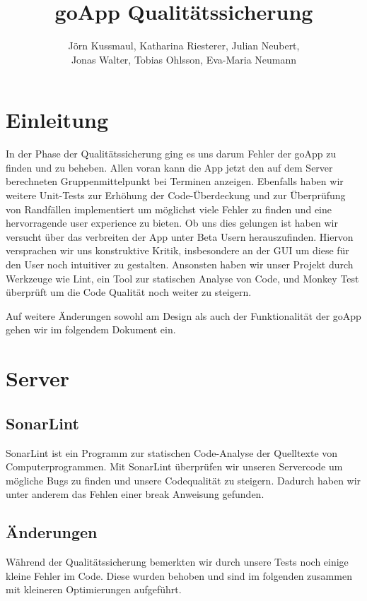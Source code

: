 \documentclass{scrartcl}
\title{goApp Qualitätssicherung}
\author{Jörn Kussmaul, Katharina Riesterer, Julian Neubert,\\ Jonas Walter, Tobias Ohlsson, Eva-Maria Neumann}
\begin{document}
	\maketitle
	\newpage
	\tableofcontents
	\newpage

\section{Einleitung}
In der Phase der Qualitätssicherung ging es uns darum Fehler der goApp zu finden und zu beheben.
Allen voran kann die App jetzt den auf dem Server berechneten Gruppenmittelpunkt bei Terminen anzeigen.
\newline
Ebenfalls haben wir weitere Unit-Tests zur Erhöhung der Code-Überdeckung und zur Überprüfung von Randfällen implementiert um möglichst viele Fehler zu finden und eine hervorragende user experience zu bieten.
\newline
Ob uns dies gelungen ist haben wir versucht über das verbreiten der App unter Beta Usern herauszufinden.
Hiervon versprachen wir uns konstruktive Kritik, insbesondere an der GUI um diese für den User noch intuitiver zu gestalten. 
Ansonsten haben wir unser Projekt durch Werkzeuge wie Lint, ein Tool zur statischen Analyse von Code, und Monkey Test überprüft um die Code Qualität noch weiter zu steigern.

Auf weitere Änderungen sowohl am Design als auch der Funktionalität der goApp gehen wir im folgendem Dokument ein.

\newpage
\section{Server}
\subsection{SonarLint}
SonarLint ist ein Programm zur statischen Code-Analyse der Quelltexte von Computerprogrammen. Mit SonarLint überprüfen wir unseren Servercode um mögliche Bugs zu finden und unsere Codequalität zu steigern.
Dadurch haben wir unter anderem das Fehlen einer break Anweisung gefunden.

\subsection{Änderungen}
Während der Qualitätssicherung bemerkten wir durch unsere Tests noch einige kleine Fehler im Code. Diese wurden behoben und sind im folgenden zusammen mit kleineren Optimierungen aufgeführt.
\end{document}
